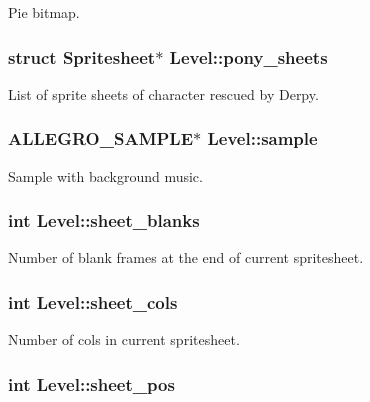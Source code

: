 \-Pie bitmap. \hypertarget{structLevel_a591b830752cc796a306e96166f736e3b}{
\subsubsection[{pony\-\_\-sheets}]{\setlength{\rightskip}{0pt plus 5cm}struct {\bf \-Spritesheet}$\ast$ {\bf \-Level\-::pony\-\_\-sheets}}}\label{structLevel_a591b830752cc796a306e96166f736e3b}
\-List of sprite sheets of character rescued by \-Derpy. \hypertarget{structLevel_a234fa7b9ec35dd360e4e3c48a944fc7d}{
\subsubsection[{sample}]{\setlength{\rightskip}{0pt plus 5cm}\-A\-L\-L\-E\-G\-R\-O\-\_\-\-S\-A\-M\-P\-L\-E$\ast$ {\bf \-Level\-::sample}}}\label{structLevel_a234fa7b9ec35dd360e4e3c48a944fc7d}
\-Sample with background music. \hypertarget{structLevel_aebaaba311e5d4842fdbd8c50edd40808}{
\subsubsection[{sheet\-\_\-blanks}]{\setlength{\rightskip}{0pt plus 5cm}int {\bf \-Level\-::sheet\-\_\-blanks}}}\label{structLevel_aebaaba311e5d4842fdbd8c50edd40808}
\-Number of blank frames at the end of current spritesheet. \hypertarget{structLevel_a8a5c443169a4ff15f330a65473eedb1b}{
\subsubsection[{sheet\-\_\-cols}]{\setlength{\rightskip}{0pt plus 5cm}int {\bf \-Level\-::sheet\-\_\-cols}}}\label{structLevel_a8a5c443169a4ff15f330a65473eedb1b}
\-Number of cols in current spritesheet. \hypertarget{structLevel_a21c699af201ffe60ccd1319b3f540947}{
\subsubsection[{sheet\-\_\-pos}]{\setlength{\rightskip}{0pt plus 5cm}int {\bf \-Level\-::sheet\-\_\-pos}}}\label{structLevel_a21c699af201ffe60ccd1319b3f540947}
